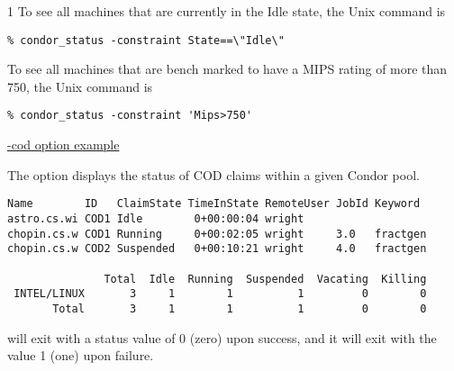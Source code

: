 \begin{ManPage}{\label{man-condor-status}}{1}
To see all machines that are currently in the Idle state,
the Unix command is
\begin{verbatim}
% condor_status -constraint State==\"Idle\"
\end{verbatim}

To see all machines that are bench marked to have a MIPS rating
of more than 750, the Unix command is
\begin{verbatim}
% condor_status -constraint 'Mips>750' 
\end{verbatim}

\underline{-cod option example}

The  option displays the status of COD
claims within a given Condor pool. 

\footnotesize
\begin{verbatim}
Name        ID   ClaimState TimeInState RemoteUser JobId Keyword
astro.cs.wi COD1 Idle        0+00:00:04 wright
chopin.cs.w COD1 Running     0+00:02:05 wright     3.0   fractgen
chopin.cs.w COD2 Suspended   0+00:10:21 wright     4.0   fractgen

               Total  Idle  Running  Suspended  Vacating  Killing
 INTEL/LINUX       3     1        1          1         0        0
       Total       3     1        1          1         0        0
\end{verbatim}
\normalsize


\ExitStatus

 will exit with a status value of 0 (zero) upon success,
and it will exit with the value 1 (one) upon failure.

\end{ManPage}

